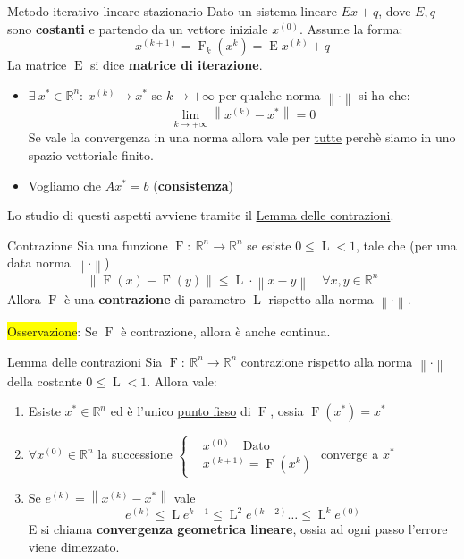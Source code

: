 \documentclass{article}
\begin{document}
\begin{defi}{Metodo iterativo lineare stazionario}{}
    Dato un sistema lineare $Ex+q$, dove $E,q$ sono \textbf{costanti} e partendo da un vettore iniziale
    $x^{(0)}$. Assume la forma:
    \[x^{(k+1)}=\operatorname{F}_k(x^k)=\operatorname{E}x^{(k)}+q\]
    La matrice $\operatorname{E}$ si dice \textbf{matrice di iterazione}.
\end{defi}
\begin{itemize}
    \item $\exists\ x^\ast\in\mathbb R^n:\ x^{(k)}\to x^\ast$ se $k\to +\infty$ per qualche norma $\left\|\cdot\right\|$ si ha che:
          \[\lim_{k\to +\infty}\left\|x^{(k)}-x^\ast\right\|=0\]
          Se vale la convergenza in una norma allora vale per \underline{tutte} perchè siamo in uno spazio vettoriale finito.
    \item Vogliamo che $Ax^\ast=b$ (\textbf{consistenza})
\end{itemize}

Lo studio di questi aspetti avviene tramite il \underline{Lemma delle contrazioni}.
\begin{defi}{Contrazione}{}
    Sia una funzione $\operatorname{F}:\ \mathbb R^n\to\mathbb R^n$ se esiste $0\le\operatorname{L}<1$, tale che (per una data
    norma $\left\|\cdot\right\|$)
    \[\left\|\operatorname{F}(x)-\operatorname{F}(y)\right\|\le\operatorname{L}\cdot\left\|x-y\right\|\quad\forall x,y\in\mathbb R^n\]
    Allora $\operatorname{F}$ è una \textbf{contrazione} di parametro $\operatorname L$ rispetto alla norma $\left\|\cdot\right\|$.
\end{defi}
\colorbox{yellow}{Osservazione}: Se $\operatorname{F}$ è contrazione, allora è anche continua.

\begin{theo}{Lemma delle contrazioni}{}
    Sia $\operatorname{F}:\ \mathbb R^n\to\mathbb R^n$ contrazione rispetto alla norma $\left\|\cdot\right\|$ della costante $0\le\operatorname{L}<1$. Allora vale:

    \begin{enumerate}
        \item Esiste $x^\ast\in\mathbb R^n$ ed è l'unico \underline{punto fisso} di $\operatorname{F}$, ossia \(\operatorname{F}(x^\ast)=x^\ast\)
        \item $\forall x^{(0)}\in\mathbb R^n$ la successione $\begin{cases}
                       & x^{(0)}\quad\text{Dato}         \\
                       & x^{(k+1)}=\operatorname{F}(x^k)
                  \end{cases}$ converge a $x^\ast$
        \item Se $e^{(k)}=\left\|x^{(k)}-x^\ast\right\|$ vale
              \[e^{(k)}\le\operatorname{L}e^{k-1}\le\operatorname{L}^2e^{(k-2)}\dots\le\operatorname{L}^ke^{(0)}\]
              E si chiama \textbf{convergenza geometrica lineare}, ossia ad ogni passo l'errore viene dimezzato.
    \end{enumerate}
\end{theo}
\end{document}
